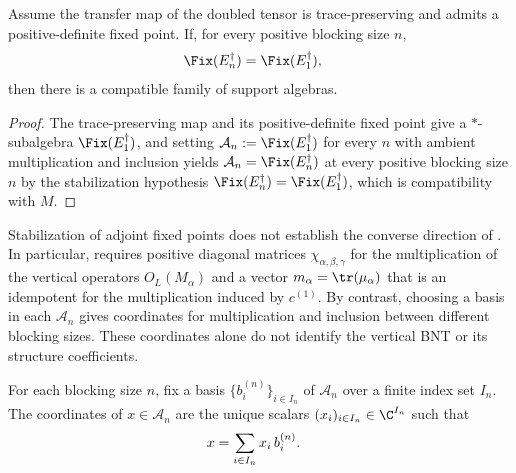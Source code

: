 \begin{lemma}%
    \label{thm:mpdo_algebra_from_stabilized_adjoint_fixedpoints}
    \leanok
    Assume the transfer map of the doubled tensor is trace-preserving and
    admits a positive-definite fixed point. If, for every positive blocking
    size $n$,
    \begin{align}
        \Fix(E_n^{\dagger}) & = \Fix(E_1^{\dagger}),
        \notag
    \end{align}
    then there is a compatible family of support algebras.
\end{lemma}
\begin{proof}\leanok
    The trace-preserving map and its positive-definite fixed point give a
    $*$-subalgebra $\Fix(E_1^\dagger)$, and setting
    $\mathcal{A}_n := \Fix(E_1^{\dagger})$ for every $n$ with ambient
    multiplication and inclusion yields
    $\mathcal{A}_n = \Fix(E_n^{\dagger})$ at every positive blocking
    size $n$ by the stabilization hypothesis
    $\Fix(E_n^{\dagger}) = \Fix(E_1^{\dagger})$, which is compatibility with $M$.
\end{proof}

Stabilization of adjoint fixed points does not establish the converse direction of
\cite[Theorem~4.14]{Cirac2016MPDO_arXiv}. In particular,
\cite[Theorem~4.14(ii)]{Cirac2016MPDO_arXiv} requires positive diagonal
matrices $\chi_{\alpha,\beta,\gamma}$ for the multiplication of the vertical
operators $O_L(M_\alpha)$ and a vector $m_\alpha=\tr(\mu_\alpha)$ that is
an idempotent for the multiplication induced by $c^{(1)}$.
By contrast, choosing a basis in each $\mathcal{A}_n$ gives coordinates for
multiplication and inclusion between different blocking sizes. These
coordinates alone do not identify the vertical BNT or its structure
coefficients.

\begin{definition}%
    \label{def:mpdo_blocked_coefficients}
    \leanok
    For each blocking size $n$, fix a basis
    $\{b_i^{(n)}\}_{i \in I_n}$ of $\mathcal{A}_n$ over a finite index set
    $I_n$. The coordinates of $x \in \mathcal{A}_n$ are the unique scalars
    $(x_i)_{i \in I_n} \in \C^{I_n}$ such that
    \begin{align}
        x & = \sum_{i \in I_n} x_i\, b_i^{(n)}.
        \notag
    \end{align}
\end{definition}

